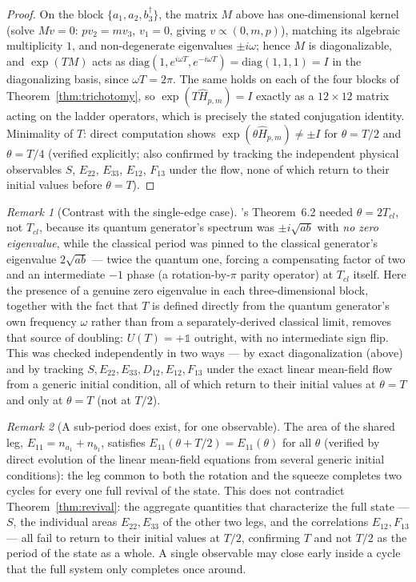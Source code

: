 \documentclass[11pt]{amsart}
\theoremstyle{remark}
\newtheorem*{remark}{Remark}
\begin{document}
\begin{proof}
On the block $\{a_1,a_2,b_3^\dagger\}$, the matrix $M$ above has one-dimensional kernel (solve $Mv=0$: $pv_2=mv_3$, $v_1=0$, giving $v\propto(0,m,p)$), matching its algebraic multiplicity $1$, and non-degenerate eigenvalues $\pm i\omega$; hence $M$ is diagonalizable, and $\exp(TM)$ acts as $\mathrm{diag}(1,e^{i\omega T},e^{-i\omega T})=\mathrm{diag}(1,1,1)=I$ in the diagonalizing basis, since $\omega T=2\pi$. The same holds on each of the four blocks of Theorem~\ref{thm:trichotomy}, so $\exp(T\hat H_{p,m})=I$ exactly as a $12\times12$ matrix acting on the ladder operators, which is precisely the stated conjugation identity. Minimality of $T$: direct computation shows $\exp(\theta\hat H_{p,m})\neq\pm I$ for $\theta=T/2$ and $\theta=T/4$ (verified explicitly; also confirmed by tracking the independent physical observables $S$, $E_{22}$, $E_{33}$, $E_{12}$, $F_{13}$ under the flow, none of which return to their initial values before $\theta=T$).
\end{proof}

\begin{remark}[Contrast with the single-edge case]
\cite{QuantumRealizations}'s Theorem~6.2 needed $\theta=2T_{cl}$, not $T_{cl}$, because its quantum generator's spectrum was $\pm i\sqrt{ab}$ with \emph{no zero eigenvalue}, while the classical period was pinned to the classical generator's eigenvalue $2\sqrt{ab}$ --- twice the quantum one, forcing a compensating factor of two and an intermediate $-1$ phase (a rotation-by-$\pi$ parity operator) at $T_{cl}$ itself. Here the presence of a genuine zero eigenvalue in each three-dimensional block, together with the fact that $T$ is defined directly from the quantum generator's own frequency $\omega$ rather than from a separately-derived classical limit, removes that source of doubling: $U(T)=+\mathbb 1$ outright, with no intermediate sign flip. This was checked independently in two ways --- by exact diagonalization (above) and by tracking $S,E_{22},E_{33},D_{12},E_{12},F_{13}$ under the exact linear mean-field flow from a generic initial condition, all of which return to their initial values at $\theta=T$ and only at $\theta=T$ (not at $T/2$).
\end{remark}

\begin{remark}[A sub-period does exist, for one observable]\label{rem:subperiod}
The area of the shared leg, $E_{11}=n_{a_1}+n_{b_1}$, satisfies $E_{11}(\theta+T/2)=E_{11}(\theta)$ for all $\theta$ (verified by direct evolution of the linear mean-field equations from several generic initial conditions): the leg common to both the rotation and the squeeze completes two cycles for every one full revival of the state. This does not contradict Theorem~\ref{thm:revival}: the aggregate quantities that characterize the full state --- $S$, the individual areas $E_{22},E_{33}$ of the other two legs, and the correlations $E_{12},F_{13}$ --- all fail to return to their initial values at $T/2$, confirming $T$ and not $T/2$ as the period of the state as a whole. A single observable may close early inside a cycle that the full system only completes once around.
\end{remark}
\end{document}
